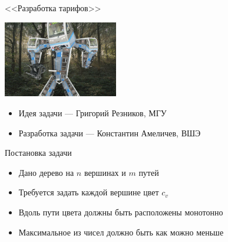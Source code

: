 \begin{frame}
  \begin{center}
    \LARGE <<Разработка тарифов>>
  \end{center}

  \begin{center}
      \includegraphics[width=5cm]{memes/d-meme.jpg}
  \end{center}

  \begin{itemize}
  \item Идея задачи --- Григорий Резников, МГУ
  \item Разработка задачи --- Константин Амеличев, ВШЭ
  \end{itemize}

\end{frame}

\begin{frame}{Постановка задачи}

  \begin{itemize}
  \item Дано дерево на $n$ вершинах и $m$ путей
  \item Требуется задать каждой вершине цвет $c_v$
  \item Вдоль пути цвета должны быть расположены монотонно
  \item Максимальное из чисел должно быть как можно меньше
  \end{itemize}

\end{frame}

